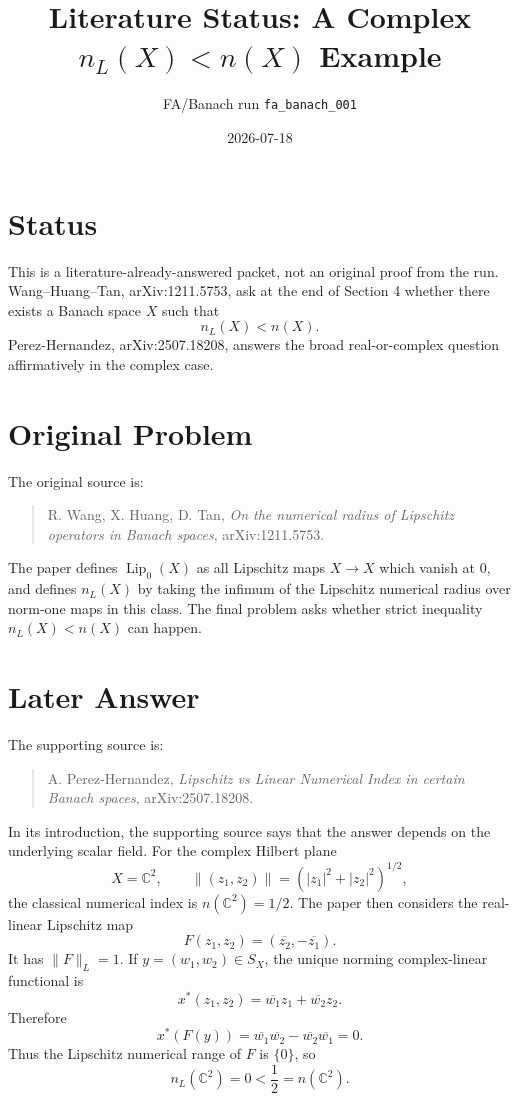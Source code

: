 \documentclass[11pt]{article}
\title{Literature Status: A Complex \texorpdfstring{$n_L(X)<n(X)$}{nL<n} Example}
\author{FA/Banach run \texttt{fa\_banach\_001}}
\date{2026-07-18}
\begin{document}
\maketitle

\section*{Status}

This is a literature-already-answered packet, not an original proof from the
run.  Wang--Huang--Tan, arXiv:1211.5753, ask at the end of Section 4 whether
there exists a Banach space \(X\) such that
\[
  n_L(X)<n(X).
\]
Perez-Hernandez, arXiv:2507.18208, answers the broad real-or-complex question
affirmatively in the complex case.

\section*{Original Problem}

The original source is:

\begin{quote}
R. Wang, X. Huang, D. Tan, \emph{On the numerical radius of Lipschitz operators
in Banach spaces}, arXiv:1211.5753.
\end{quote}

The paper defines \(\operatorname{Lip}_0(X)\) as all Lipschitz maps
\(X\to X\) which vanish at \(0\), and defines \(n_L(X)\) by taking the
infimum of the Lipschitz numerical radius over norm-one maps in this class.
The final problem asks whether strict inequality \(n_L(X)<n(X)\) can happen.

\section*{Later Answer}

The supporting source is:

\begin{quote}
A. Perez-Hernandez, \emph{Lipschitz vs Linear Numerical Index in certain
Banach spaces}, arXiv:2507.18208.
\end{quote}

In its introduction, the supporting source says that the answer depends on the
underlying scalar field.  For the complex Hilbert plane
\[
  X=\mathbb C^2,\qquad
  \|(z_1,z_2)\|=(|z_1|^2+|z_2|^2)^{1/2},
\]
the classical numerical index is \(n(\mathbb C^2)=1/2\).  The paper then
considers the real-linear Lipschitz map
\[
  F(z_1,z_2)=(\overline{z_2},-\overline{z_1}).
\]
It has \(\|F\|_L=1\).  If \(y=(w_1,w_2)\in S_X\), the unique norming
complex-linear functional is
\[
  x^*(z_1,z_2)=\overline{w_1}z_1+\overline{w_2}z_2.
\]
Therefore
\[
  x^*(F(y))
  =\overline{w_1}\overline{w_2}
   -\overline{w_2}\overline{w_1}
  =0.
\]
Thus the Lipschitz numerical range of \(F\) is \(\{0\}\), so
\[
  n_L(\mathbb C^2)=0<\frac12=n(\mathbb C^2).
\]
\end{document}
